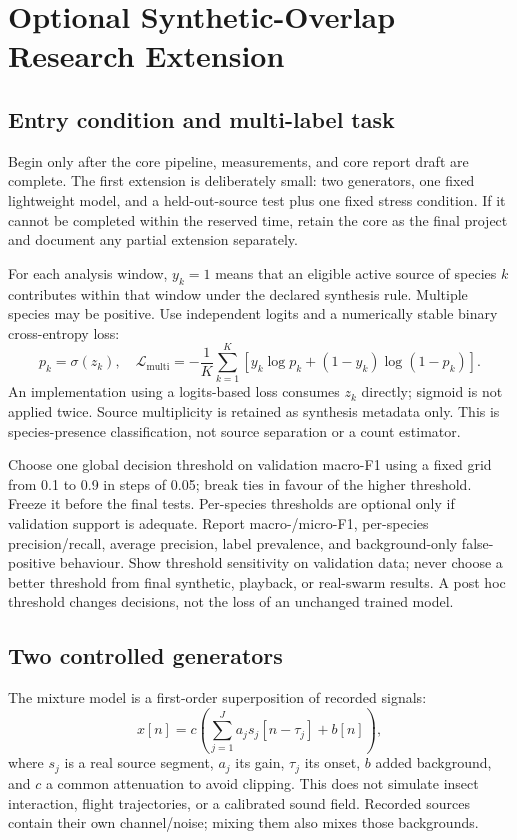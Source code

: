 \documentclass[a4paper,11pt]{article}
\begin{document}
\section{Optional Synthetic-Overlap Research Extension}
\subsection{Entry condition and multi-label task}
Begin only after the core pipeline, measurements, and core report draft are complete. The first extension is deliberately small: two generators, one fixed lightweight model, and a held-out-source test plus one fixed stress condition. If it cannot be completed within the reserved time, retain the core as the final project and document any partial extension separately.

For each analysis window, $y_k=1$ means that an eligible active source of species $k$ contributes within that window under the declared synthesis rule. Multiple species may be positive. Use independent logits and a numerically stable binary cross-entropy loss:
\begin{equation}
 p_k=\sigma(z_k),\quad
 \mathcal{L}_{\mathrm{multi}}=-\frac{1}{K}\sum_{k=1}^{K}
 \left[y_k\log p_k+(1-y_k)\log(1-p_k)\right].
\end{equation}
An implementation using a logits-based loss consumes $z_k$ directly; sigmoid is not applied twice. Source multiplicity is retained as synthesis metadata only. This is species-presence classification, not source separation or a count estimator.

Choose one global decision threshold on validation macro-F1 using a fixed grid from 0.1 to 0.9 in steps of 0.05; break ties in favour of the higher threshold. Freeze it before the final tests. Per-species thresholds are optional only if validation support is adequate. Report macro-/micro-F1, per-species precision/recall, average precision, label prevalence, and background-only false-positive behaviour. Show threshold sensitivity on validation data; never choose a better threshold from final synthetic, playback, or real-swarm results. A post hoc threshold changes decisions, not the loss of an unchanged trained model.

\subsection{Two controlled generators}
The mixture model is a first-order superposition of recorded signals:
\begin{equation}
 x[n]=c\left(\sum_{j=1}^{J}a_j s_j[n-\tau_j]+b[n]\right),
 \label{eq:mix}
\end{equation}
where $s_j$ is a real source segment, $a_j$ its gain, $\tau_j$ its onset, $b$ added background, and $c$ a common attenuation to avoid clipping. This does not simulate insect interaction, flight trajectories, or a calibrated sound field. Recorded sources contain their own channel/noise; mixing them also mixes those backgrounds.
\end{document}

